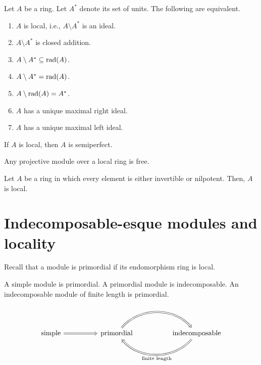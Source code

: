 \documentclass[12pt]{article}
\begin{document}
\begin{thm}
	Let $A$ be a ring. Let $A^{\ast}$ denote its set of units. The following are equivalent.
	\begin{enumerate}[label=(\alph*)]
		\item $A$ is local, i.e., $A \setminus A^{\ast}$ is an ideal.
		\item $A \setminus A^{\ast}$ is closed addition.
		\item $A \setminus A^{\ast} \subseteq \operatorname{rad}(A)$.
		\item $A \setminus A^{\ast} = \operatorname{rad}(A)$.
		\item $A \setminus \operatorname{rad}(A) = A^{\ast}$.
		\item $A$ has a unique maximal right ideal.
		\item $A$ has a unique maximal left ideal.
	\end{enumerate}
\end{thm}

\begin{thm}
	If $A$ is local, then $A$ is semiperfect.
\end{thm}

\begin{thm}[Kaplansky]
	Any projective module over a local ring is free.
\end{thm}

\begin{thm} \label{thm:invertible-or-nilpotent-is-local}
	Let $A$ be a ring in which every element is either invertible or nilpotent. 
	Then, $A$ is local.
\end{thm}

\section{Indecomposable-esque modules and locality}

Recall that a module is primordial if its endomorphism ring is local.
\begin{thm}
	A simple module is primordial. \newline
	A primordial module is indecomposable. \newline
	An indecomposable module of finite length is primordial.
\end{thm}

\begin{equation*} 
	\begin{tikzcd}
	\text{simple} \arrow[rr, Rightarrow] && \text{primordial} \arrow[rr, Rightarrow, bend left=49] &  & \text{indecomposable}  \arrow[ll, "\text{finite length}", Rightarrow, bend left=49]
\end{tikzcd}
\end{equation*}
\end{document}
